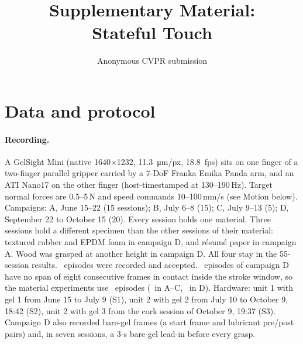\documentclass[10pt,twocolumn,letterpaper]{article}
\title{Supplementary Material:\\Stateful Touch}
\author{Anonymous CVPR submission} %
\begin{document}
\maketitle
\renewcommand{\thesection}{\Alph{section}}

\section{Data and protocol}
\paragraph{Recording.} A GelSight Mini (native 1640$\times$1232, \SI{11.3}{\micro\metre}/px, \SI{18.8}{fps}) sits on one finger of a two-finger parallel gripper carried by a 7-DoF Franka Emika Panda arm, and an ATI Nano17 on the other finger (host-timestamped at 130--190\,Hz). Target normal forces are 0.5--5\,N and speed commands 10--100\,mm/s (see Motion below). Campaigns: A, June 15--22 (15 sessions); B, July 6--8 (15); C, July 9--13 (5); D, September 22 to October 15 (20). Every session holds one material. Three sessions hold a different specimen than the other sessions of their material: textured rubber and EPDM foam in campaign D, and r\'esum\'e paper in campaign A. Wood was grasped at another height in campaign D. All four stay in the 55-session results. \EpRecorded\ episodes were recorded and accepted. \EpNoCrops\ episodes of campaign D have no span of eight consecutive frames in contact inside the stroke window, so the material experiments use \EpCrops\ episodes (\EpTrainABC\ in A--C, \EpTestD\ in D). Hardware: unit 1 with gel 1 from June 15 to July 9 (S1), unit 2 with gel 2 from July 10 to October 9, 18:42 (S2), unit 2 with gel 3 from the cork session of October 9, 19:37 (S3). Campaign D also recorded bare-gel frames (a start frame and lubricant pre/post pairs) and, in seven sessions, a 3-s bare-gel lead-in before every grasp.
\end{document}
